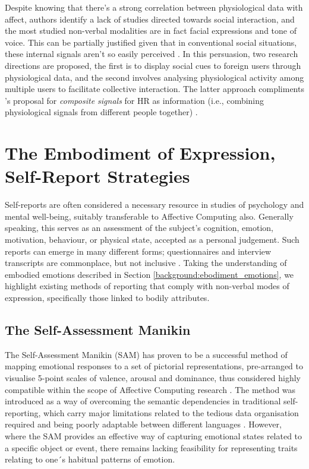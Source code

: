 Despite knowing that there's a strong correlation between physiological data with affect, authors identify a lack of studies directed towards social interaction, and the most studied non-verbal modalities are in fact facial expressions and tone of voice. This can be partially justified given that in conventional social situations, these internal signals aren't so easily perceived \cite{vinciarelli_social_2009}. In this persuasion, two research directions are proposed, the first is to display social cues to foreign users through physiological data, and the second involves analysing physiological activity among multiple users to facilitate collective interaction. The latter approach compliments \citeauthor{slovak_understanding_2012}'s proposal for \textit{composite signals} for HR as information (i.e., combining physiological signals from different people together) \cite{slovak_understanding_2012}.

\section{The Embodiment of Expression, Self-Report Strategies}
\label{lit_review:self_report}

Self-reports are often considered a necessary resource in studies of psychology and mental well-being, suitably transferable to Affective Computing also. Generally speaking, this serves as an assessment of the subject's cognition, emotion, motivation, behaviour, or physical state, accepted as a personal judgement. Such reports can emerge in many different forms; questionnaires and interview transcripts are commonplace, but not inclusive \cite{barker_self-report_2016}. Taking the understanding of embodied emotions described in Section \ref{background:ebodiment_emotions}, we highlight existing methods of reporting that comply with non-verbal modes of expression, specifically those linked to bodily attributes.

\subsection*{The Self-Assessment Manikin}

The Self-Assessment Manikin (SAM) has proven to be a successful method of mapping emotional responses to a set of pictorial representations, pre-arranged to visualise 5-point scales of valence, arousal and dominance, thus considered highly compatible within the scope of Affective Computing research \cite{broekens_affectbutton_2013,zeigler-hill_self-assessment_2017}. The method was introduced as a way of overcoming the semantic dependencies in traditional self-reporting, which carry major limitations related to the tedious data organisation required and being poorly adaptable between different languages \cite{zeigler-hill_self-assessment_2017}. However, where the SAM provides an effective way of capturing emotional states related to a specific object or event, there remains lacking feasibility for representing traits relating to one´s habitual patterns of emotion.

